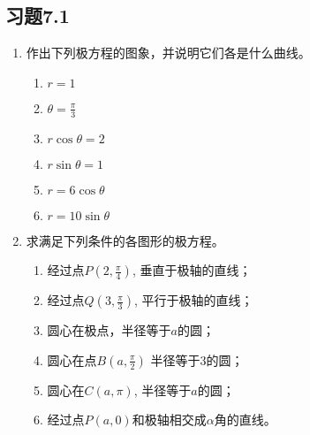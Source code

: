 \subsection*{习题7.1}
\begin{enumerate}
    \item 作出下列极方程的图象，并说明它们各是什么曲线。
\begin{multicols}{2}
    \begin{enumerate}
        \item $r=1$
        \item $\theta=\frac{\pi}{3}$
        \item $r\cos\theta =2$
        \item $r\sin\theta =1$
        \item $r=6\cos\theta$
        \item $r=10\sin\theta$
    \end{enumerate}
\end{multicols}

    \item 求满足下列条件的各图形的极方程。
\begin{enumerate}
 \item 经过点$P\left(2,\frac{\pi}{4}\right)$, 
    垂直于极轴的直线；
    \item 经过点$Q\left(3,\frac{\pi}{3}\right)$, 
    平行于极轴的直线；
    \item 圆心在极点，半径等于$a$的圆；
    \item 圆心在点$B\left(a,\frac{\pi}{2}\right)$
    半径等于3的圆；
    \item 圆心在$C(a,\pi)$, 半径等于$a$的圆；
    \item 经过点$P(a,0)$和极轴相交成$\alpha$角的直线。  
\end{enumerate}


\end{enumerate}
